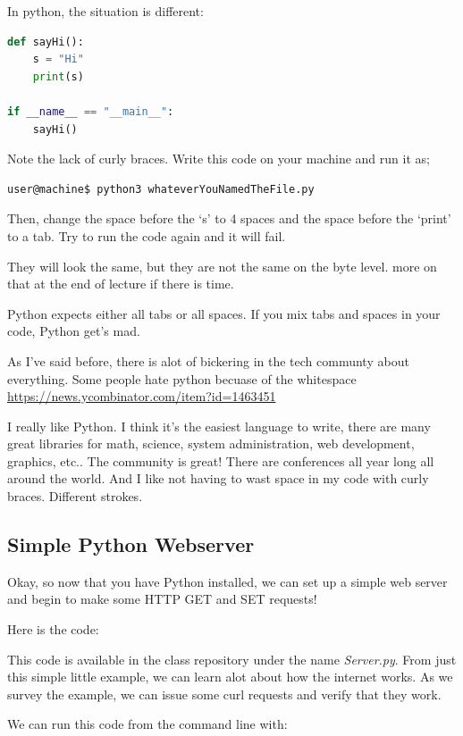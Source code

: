 \documentclass[10pt]{article}
\begin{document}
In python, the situation is different:

\begin{lstlisting}[language=Python]
def sayHi():
	s = "Hi"
	print(s)

if __name__ == "__main__":
	sayHi()
\end{lstlisting}

Note the lack of curly braces. Write this code on your machine and run it as;

\begin{lstlisting}
user@machine$ python3 whateverYouNamedTheFile.py
\end{lstlisting}

Then, change the space before the `s' to 4 spaces and the space before the `print' to a tab. Try to run the code again and it will fail.

 They will look the same, but they are not the same on the byte level. more on that at the end of lecture if there is time. 

Python expects either all tabs or all spaces. If you mix tabs and spaces in your code, Python get's mad.


As I've said before, there is alot of bickering in the tech communty about everything. Some people hate python becuase of the whitespace
\url{https://news.ycombinator.com/item?id=1463451}

I really like Python. I think it's the easiest language to write, there are many great libraries for math, science, system administration, web development, graphics, etc.. The community is great! There are conferences all year long all around the world. And I like not having to wast space in my code with curly braces. Different strokes.

\subsection{Simple Python Webserver}
Okay, so now that you have Python installed, we can set up a simple web server and begin to make some HTTP GET and SET requests!

Here is the code:


This code is available in the class repository under the name \textit{Server.py}. From just this simple little example, we can learn alot about how the internet works. As we survey the example, we can issue some curl requests and verify that they work.

We can run this code from the command line with:
\end{document}
